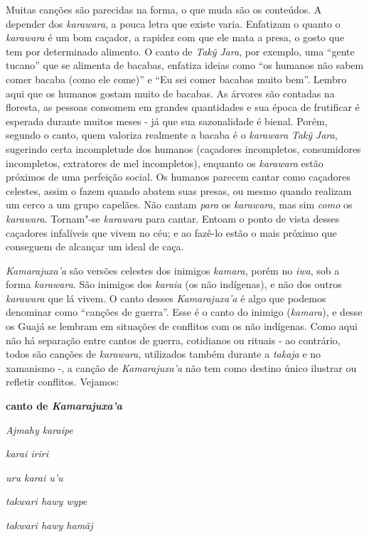 Muitas canções são parecidas na forma, o que muda são os conteúdos. A
depender dos \emph{karawara}, a pouca letra que existe varia. Enfatizam
o quanto o \emph{karawara} é um bom caçador, a rapidez com que ele mata
a presa, o gosto que tem por determinado alimento. O canto de
\emph{Takỹ} \emph{Jara}, por exemplo, uma ``gente tucano'' que se
alimenta de bacabas, enfatiza ideias como ``os humanos não sabem comer
bacaba (como ele come)'' e ``Eu sei comer bacabas muito bem''. Lembro
aqui que os humanos gostam muito de bacabas. As árvores são contadas na
floresta, as pessoas consomem em grandes quantidades e sua época de
frutificar é esperada durante muitos meses - já que sua sazonalidade é
bienal. Porém, segundo o canto, quem valoriza realmente a bacaba é o
\emph{karawara} \emph{Takỹ} \emph{Jara}, sugerindo certa incompletude
dos humanos (caçadores incompletos, consumidores incompletos, extratores
de mel incompletos), enquanto os \emph{karawara} estão próximos de uma
perfeição social. Os humanos parecem cantar como caçadores celestes,
assim o fazem quando abatem suas presas, ou mesmo quando realizam um
cerco a um grupo capelães. Não cantam \emph{para} os \emph{karawara},
mas sim \emph{como} os \emph{karawara}. Tornam"-se \emph{karawara} para
cantar. Entoam o ponto de vista desses caçadores infalíveis que vivem no
céu; e ao fazê-lo estão o mais próximo que conseguem de alcançar um
ideal de caça.

\emph{Kamarajuxa'a} são versões celestes dos inimigos \emph{kamara},
porém no \emph{iwa}, sob a forma \emph{karawara}. São inimigos dos
\emph{karaia} (os não indígenas), e não dos outros \emph{karawara} que
lá vivem. O canto desses \emph{Kamarajuxa'a} é algo que podemos
denominar como ``canções de guerra''. Esse é o canto do inimigo
(\emph{kamara}), e desse os Guajá se lembram em situações de conflitos
com os não indígenas. Como aqui não há separação entre cantos de guerra,
cotidianos ou rituais - ao contrário, todos são canções de
\emph{karawara}, utilizados também durante a \emph{takaja} e no
xamanismo -, a canção de \emph{Kamarajuxa'a} não tem como destino único
ilustrar ou refletir conflitos. Vejamos:

\textbf{canto de \emph{Kamarajuxa'a}}

\emph{Ajmahy karaipe}

\emph{karai iriri}

\emph{uru karai u'u}

\emph{takwari hawy wype}

\emph{takwari hawy hamãj}

